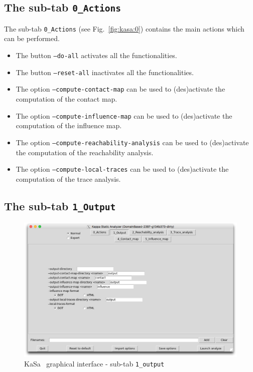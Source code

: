 \documentclass[11pt]{book}
\def\KaSa{\textsf{KaSa}}
\begin{document}
\subsection{The sub-tab \texttt{0\_Actions}}

The sub-tab \texttt{0\_Actions} (see Fig.~\ref{fig:kasa:0}) contains the main actions which can be performed.

\begin{itemize}
\item The button \texttt{--do-all} activates all the functionalities.
\item The button \texttt{--reset-all} inactivates all the functionalities.
\item The option \texttt{--compute-contact-map} can be used to (des)activate the computation of the contact map.
\item The option \texttt{--compute-influence-map} can be used to (des)activate the computation of the influence map.
\item The option \texttt{--compute-reachability-analysis} can be used to (des)activate the computation of the reachability analysis.
\item The option \texttt{--compute-local-traces} can be used to (des)activate the computation of the trace analysis.
\end{itemize}

\subsection{The sub-tab \texttt{1\_Output}}

\begin{figure}[htbp]
\centering
\includegraphics[width=12cm,bb=0 0 1904 1208]{img/kasa_1.png}
\caption{\KaSa~ graphical interface - sub-tab \texttt{1\_output}}
\label{fig:kasa:1}
\end{figure}
\end{document}
